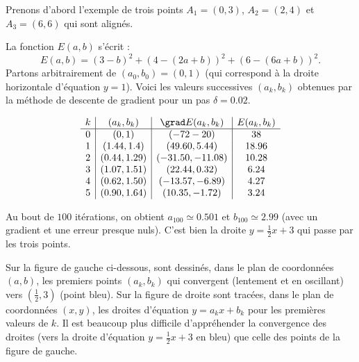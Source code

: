 \documentclass[11pt,class=report,crop=false]{standalone}
\begin{document}
\begin{exemple}
Prenons d'abord l'exemple de trois points $A_1 = (0,3)$, $A_2 = (2,4)$ et $A_3 = (6,6)$ qui sont alignés. 


La fonction $E(a,b)$ s'écrit :
$$E(a,b) = (3-b)^2 + (4-(2a+b))^2 + (6-(6a+b))^2.$$
Partons arbitrairement de $(a_0,b_0) = (0,1)$ (qui correspond à la droite horizontale d'équation $y=1$).
Voici les valeurs successives $(a_k,b_k)$ obtenues par la méthode de descente de gradient pour un pas $\delta = 0.02$.

$$
\begin{array}{c|c|c|c}
k & (a_k,b_k) & \grad E(a_k,b_k) & E(a_k,b_k) \\ \hline
0 & (0, 1) & (-72 -20) &  38 \\
1 & (1.44, 1.4) & (49.60, 5.44) &  18.96 \\
2 & (0.44, 1.29) & (-31.50, -11.08) & 10.28 \\
3 & (1.07, 1.51) & (22.44, 0.32) &  6.24 \\
4 & (0.62, 1.50) & (-13.57, -6.89) &  4.27 \\
5 & (0.90, 1.64) & (10.35, -1.72) &  3.24 \\
\end{array}
$$

Au bout de $100$ itérations, on obtient $a_{100} \simeq 0.501$ et $b_{100} \simeq 2.99$ (avec un gradient et une erreur presque nuls). C'est bien la droite $y = \frac12x+3$ qui passe par les trois points.


Sur la figure de gauche ci-dessous, sont dessinés, dans le plan de coordonnées $(a,b)$, les premiers points $(a_k,b_k)$ qui convergent (lentement et en oscillant) vers $(\frac12,3)$ (point bleu). Sur la figure de droite sont tracées, dans le plan de coordonnées $(x,y)$, les droites d'équation $y = a_kx+b_k$ pour les premières valeurs de $k$. 
Il est beaucoup plus difficile d'appréhender la convergence des droites (vers la droite d'équation $y=\frac12x+3$ en bleu) que celle des points de la figure de gauche.


\end{exemple}
\end{document}
